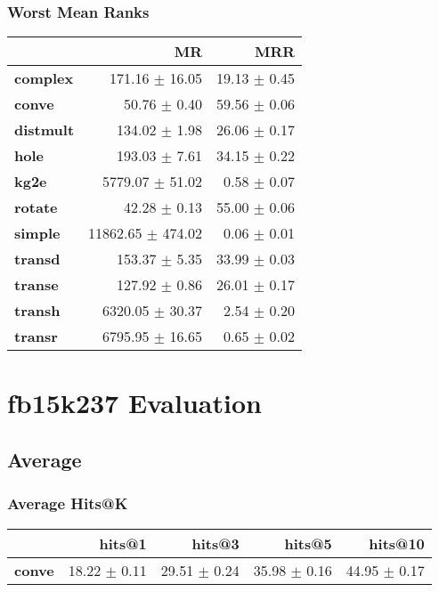 \documentclass{article}
\begin{document}
    \subsubsection{Worst Mean Ranks}
    \begin{center}
    \begin{tabular}{lrr}
\toprule
{} &                 MR &           MRR \\
\midrule
\textbf{complex } &     171.16 $\pm$ 16.05 &  19.13 $\pm$ 0.45 \\
\textbf{conve   } &       50.76 $\pm$ 0.40 &  59.56 $\pm$ 0.06 \\
\textbf{distmult} &      134.02 $\pm$ 1.98 &  26.06 $\pm$ 0.17 \\
\textbf{hole    } &      193.03 $\pm$ 7.61 &  34.15 $\pm$ 0.22 \\
\textbf{kg2e    } &    5779.07 $\pm$ 51.02 &   0.58 $\pm$ 0.07 \\
\textbf{rotate  } &       42.28 $\pm$ 0.13 &  55.00 $\pm$ 0.06 \\
\textbf{simple  } &  11862.65 $\pm$ 474.02 &   0.06 $\pm$ 0.01 \\
\textbf{transd  } &      153.37 $\pm$ 5.35 &  33.99 $\pm$ 0.03 \\
\textbf{transe  } &      127.92 $\pm$ 0.86 &  26.01 $\pm$ 0.17 \\
\textbf{transh  } &    6320.05 $\pm$ 30.37 &   2.54 $\pm$ 0.20 \\
\textbf{transr  } &    6795.95 $\pm$ 16.65 &   0.65 $\pm$ 0.02 \\
\bottomrule
\end{tabular}

    \end{center}

\section{fb15k237 Evaluation}
    \subsection{Average}
    \subsubsection{Average Hits@K}
    \begin{center}
    \begin{tabular}{lrrrr}
\toprule
{} &        hits@1 &        hits@3 &        hits@5 &       hits@10 \\
\midrule
\textbf{conve} &  18.22 $\pm$ 0.11 &  29.51 $\pm$ 0.24 &  35.98 $\pm$ 0.16 &  44.95 $\pm$ 0.17 \\
\bottomrule
\end{tabular}

    \end{center}
\end{document}
